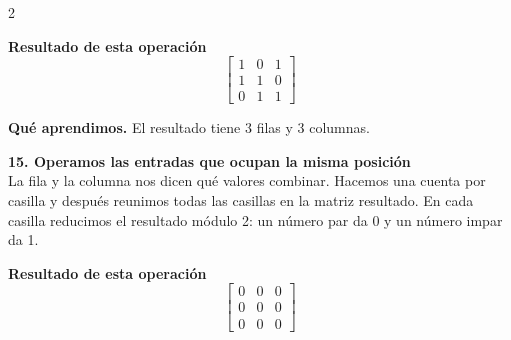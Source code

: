 \documentclass[11pt,a4paper,landscape]{article}
\begin{document}
\begin{multicols*}{2}
\begin{minipage}{\linewidth}
\par\smallskip \textbf{Resultado de esta operación}\[\begin{bmatrix}1 & 0 & 1\\1 & 1 & 0\\0 & 1 & 1\end{bmatrix}\]
\par\smallskip\textbf{Qué aprendimos.} El resultado tiene 3 filas y 3 columnas.
\end{minipage}\par\medskip
\noindent\begin{minipage}{\linewidth}\textbf{15. Operamos las entradas que ocupan la misma posición}\\[2pt]La fila y la columna nos dicen qué valores combinar. Hacemos una cuenta por casilla y después reunimos todas las casillas en la matriz resultado. En cada casilla reducimos el resultado módulo 2: un número par da 0 y un número impar da 1.
\par{}\par\smallskip
\par\smallskip \textbf{Resultado de esta operación}\[\begin{bmatrix}0 & 0 & 0\\0 & 0 & 0\\0 & 0 & 0\end{bmatrix}\]

\end{minipage}
\end{multicols*}
\end{document}
